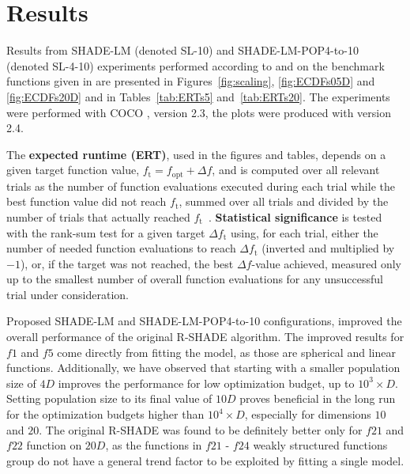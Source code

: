 \documentclass[manuscript]{acmart}
\newcommand{\Df}{\ensuremath{\Delta f}}
\newcommand{\fopt}{\ensuremath{f_\mathrm{opt}}}
\newcommand{\ftarget}{\ensuremath{f_\mathrm{t}}}
\begin{document}
\section{Results}

Results from SHADE-LM (denoted SL-10) and SHADE-LM-POP4-to-10 (denoted SL-4-10) experiments performed according to \cite{hansen2016exp} and \cite{hansen2016perfass} on the
benchmark functions given in \cite{wp200901_2010,hansen2010fun} are
presented in Figures~\ref{fig:scaling}, \ref{fig:ECDFs05D} and
\ref{fig:ECDFs20D} and in Tables~\ref{tab:ERTs5} and~\ref{tab:ERTs20}.
The experiments were performed with COCO \cite{hansen2020cocoplat}, version
{2.3}, the plots were produced with version {2.4}.

The \textbf{expected runtime (ERT)}, used in the figures and tables,
depends on a given target function value, $\ftarget=\fopt+\Df$, and is
computed over all relevant trials as the number of function
evaluations executed during each trial while the best function value
did not reach \ftarget, summed over all trials and divided by the
number of trials that actually reached \ftarget\
\cite{hansen2012exp,price1997dev}.  \textbf{Statistical significance}
is tested with the rank-sum test for a given target $\Delta\ftarget$
using, for each trial,
either the number of needed function evaluations to reach
$\Delta\ftarget$ (inverted and multiplied by $-1$), or, if the target
was not reached, the best $\Df$-value achieved, measured only up to
the smallest number of overall function evaluations for any
unsuccessful trial under consideration.

Proposed SHADE-LM and SHADE-LM-POP4-to-10 configurations,
improved the overall performance of the original R-SHADE algorithm.
The improved results for $f1$ and $f5$ come directly from fitting the model,
as those are spherical and linear functions.
Additionally, we have observed that starting with a smaller population size
of $4D$ improves the performance for low optimization budget,
up to $10^3 \times D$. Setting population size to its final value
of $10D$ proves beneficial in the long run for the optimization
budgets higher than $10^4 \times D$, especially for dimensions $10$
and $20$.
The original R-SHADE was found to be definitely better only for $f21$
and $f22$ function on $20D$,
as the functions in $f21$ - $f24$
weakly structured functions group do not have a general trend factor
to be exploited by fitting a single model.
\end{document}
